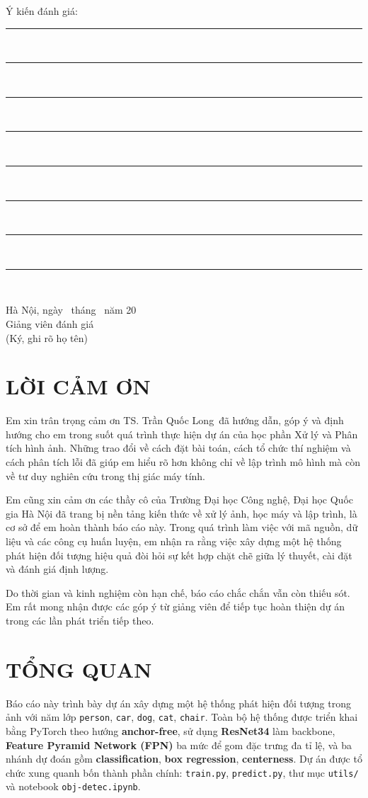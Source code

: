 \documentclass[12pt,a4paper]{article}
\newcommand{\advisorname}{TS. Trần Quốc Long}
\begin{document}
\noindent Ý kiến đánh giá:\\[0.4cm]
\rule{\textwidth}{0.4pt}\\[0.85cm]
\rule{\textwidth}{0.4pt}\\[0.85cm]
\rule{\textwidth}{0.4pt}\\[0.85cm]
\rule{\textwidth}{0.4pt}\\[0.85cm]
\rule{\textwidth}{0.4pt}\\[0.85cm]
\rule{\textwidth}{0.4pt}\\[0.85cm]
\rule{\textwidth}{0.4pt}\\[0.85cm]
\rule{\textwidth}{0.4pt}\\[0.85cm]

\vfill
\begin{flushright}
    Hà Nội, ngày \dotfill\ tháng \dotfill\ năm 20\dotfill\\[0.9cm]
    Giảng viên đánh giá\\[1.8cm]
    (Ký, ghi rõ họ tên)
\end{flushright}

\clearpage
\setcounter{page}{3}

\section*{LỜI CẢM ƠN}
Em xin trân trọng cảm ơn \advisorname\ đã hướng dẫn, góp ý và định hướng cho em trong suốt quá trình thực hiện dự án của học phần Xử lý và Phân tích hình ảnh. Những trao đổi về cách đặt bài toán, cách tổ chức thí nghiệm và cách phân tích lỗi đã giúp em hiểu rõ hơn không chỉ về lập trình mô hình mà còn về tư duy nghiên cứu trong thị giác máy tính.

Em cũng xin cảm ơn các thầy cô của Trường Đại học Công nghệ, Đại học Quốc gia Hà Nội đã trang bị nền tảng kiến thức về xử lý ảnh, học máy và lập trình, là cơ sở để em hoàn thành báo cáo này. Trong quá trình làm việc với mã nguồn, dữ liệu và các công cụ huấn luyện, em nhận ra rằng việc xây dựng một hệ thống phát hiện đối tượng hiệu quả đòi hỏi sự kết hợp chặt chẽ giữa lý thuyết, cài đặt và đánh giá định lượng.

Do thời gian và kinh nghiệm còn hạn chế, báo cáo chắc chắn vẫn còn thiếu sót. Em rất mong nhận được các góp ý từ giảng viên để tiếp tục hoàn thiện dự án trong các lần phát triển tiếp theo.

\clearpage
\section*{TỔNG QUAN}
Báo cáo này trình bày dự án xây dựng một hệ thống phát hiện đối tượng trong ảnh với năm lớp \texttt{person}, \texttt{car}, \texttt{dog}, \texttt{cat}, \texttt{chair}. Toàn bộ hệ thống được triển khai bằng PyTorch theo hướng \textbf{anchor-free}, sử dụng \textbf{ResNet34} làm backbone, \textbf{Feature Pyramid Network (FPN)} ba mức để gom đặc trưng đa tỉ lệ, và ba nhánh dự đoán gồm \textbf{classification}, \textbf{box regression}, \textbf{centerness}. Dự án được tổ chức xung quanh bốn thành phần chính: \texttt{train.py}, \texttt{predict.py}, thư mục \texttt{utils/} và notebook \texttt{obj-detec.ipynb}.
\end{document}

